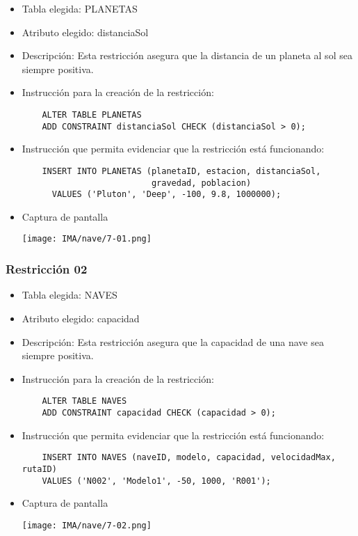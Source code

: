 \begin{itemize} 
  \item Tabla elegida: PLANETAS 
  \item Atributo elegido: distanciaSol 
  \item Descripción: Esta restricción asegura que la distancia de un planeta al sol sea siempre positiva. 
  \item Instrucción para la creación de la restricción: 
    \begin{verbatim} 
    ALTER TABLE PLANETAS 
    ADD CONSTRAINT distanciaSol CHECK (distanciaSol > 0); 
    \end{verbatim} 
  \item Instrucción que permita evidenciar que la restricción está funcionando: 
    \begin{verbatim} 
    INSERT INTO PLANETAS (planetaID, estacion, distanciaSol, 
                          gravedad, poblacion) 
      VALUES ('Pluton', 'Deep', -100, 9.8, 1000000);
    \end{verbatim} 
  \item Captura de pantalla 
  \begin{center}
    \texttt{[image: IMA/nave/7-01.png]}
  \end{center} 
\end{itemize}

\subsubsection*{Restricción 02}

\begin{itemize} 
  \item Tabla elegida: NAVES 
  \item Atributo elegido: capacidad 
  \item Descripción: Esta restricción asegura que la capacidad de una nave sea siempre positiva. 
  \item Instrucción para la creación de la restricción: 
    \begin{verbatim}
    ALTER TABLE NAVES 
    ADD CONSTRAINT capacidad CHECK (capacidad > 0); 
    \end{verbatim} 
  \item Instrucción que permita evidenciar que la restricción está funcionando: 
    \begin{verbatim} 
    INSERT INTO NAVES (naveID, modelo, capacidad, velocidadMax, rutaID) 
    VALUES ('N002', 'Modelo1', -50, 1000, 'R001'); 
    \end{verbatim} 
    
  \item Captura de pantalla 
    \begin{center} 
      \texttt{[image: IMA/nave/7-02.png]}
    \end{center} 
\end{itemize}


